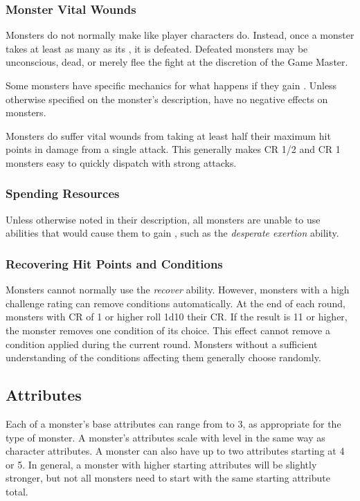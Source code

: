         \subsubsection{Monster Vital Wounds}
            Monsters do not normally make  like player characters do.
            Instead, once a monster takes at least as many  as its , it is defeated.
            Defeated monsters may be unconscious, dead, or merely flee the fight at the discretion of the Game Master.

            Some monsters have specific mechanics for what happens if they gain .
            Unless otherwise specified on the monster's description,  have no negative effects on monsters.

            Monsters do suffer vital wounds from taking at least half their maximum hit points in damage from a single attack.
            This generally makes CR 1/2 and CR 1 monsters easy to quickly dispatch with strong attacks.

        \subsubsection{Spending Resources}
            Unless otherwise noted in their description, all monsters are unable to use abilities that would cause them to gain , such as the \textit{desperate exertion} ability.

        \subsubsection{Recovering Hit Points and Conditions}
            Monsters cannot normally use the \textit{recover} ability.
            However, monsters with a high challenge rating can remove conditions automatically.
            At the end of each round, monsters with CR of 1 or higher roll 1d10 \add their CR.
            If the result is 11 or higher, the monster removes one condition of its choice.
            This effect cannot remove a condition applied during the current round.
            Monsters without a sufficient understanding of the conditions affecting them generally choose randomly.

    \subsection{Attributes}
        Each of a monster's base attributes can range from  to 3, as appropriate for the type of monster.
        A monster's attributes scale with level in the same way as character attributes.
        A monster can also have up to two attributes starting at 4 or 5.
        In general, a monster with higher starting attributes will be slightly stronger, but not all monsters need to start with the same starting attribute total.

